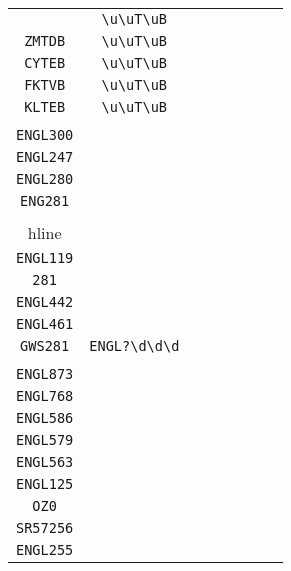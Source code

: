 \begin{longtable}{cccccccc}
\begin{tabular}{ll}
    \verb|CQTOB| & \verb|\u\uT\uB|\\
\verb|ZMTDB| & \verb|\u\uT\uB|\\
\verb|CYTEB| & \verb|\u\uT\uB|\\
\verb|FKTVB| & \verb|\u\uT\uB|\\
\verb|KLTEB| & \verb|\u\uT\uB|
\end{tabular}
\\\midrule 
\begin{tabular}{l}
    \verb|ENGL281|\\
\verb|ENGL300|\\
\verb|ENGL247|\\
\verb|ENGL280|\\
\verb|ENG281|\\
\\hline\\
\verb|ENGL119|\\
\verb|281|\\
\verb|ENGL442|\\
\verb|ENGL461|\\
\verb|GWS281|
\end{tabular}

&
\verb|ENGL?\d\d\d|
&

\begin{tabular}{l}
    \verb.((\u)*(\d)*)|(ENGL\d\d\d).\\
\verb||\\
\verb|ENGL873|\\
\verb|ENGL768|\\
\verb|ENGL586|\\
\verb|ENGL579|
\end{tabular}

&

\begin{tabular}{l}
    \verb.((\u)*(\d)*)|(ENGL\d\d)\d.\\
\verb|ENGL563|\\
\verb|ENGL125|\\
\verb|OZ0|\\
\verb|SR57256|\\
\verb|ENGL255|
\end{tabular}

&


\end{longtable}
